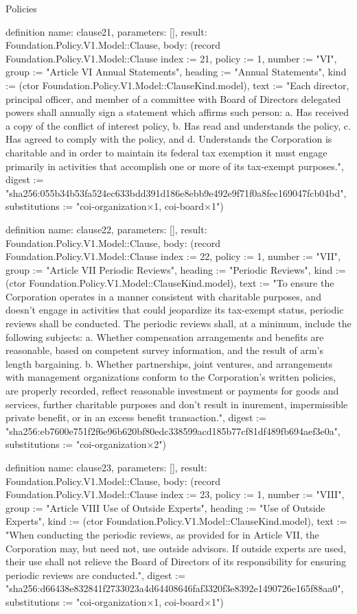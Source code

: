 \begin{lexlean}{Policies}
\begin{semanticmodule}
definition{
  name: clause21,
  parameters: [],
  result: Foundation.Policy.V1.Model::Clause,
  body: (record Foundation.Policy.V1.Model::Clause {index := 21, policy := 1, number := "VI", group := "Article VI Annual Statements", heading := "Annual Statements", kind := (ctor Foundation.Policy.V1.Model::ClauseKind.model), text := "Each director, principal officer, and member of a committee with Board of Directors delegated powers shall annually sign a statement which affirms such person: a. Has received a copy of the conflict of interest policy, b. Has read and understands the policy, c. Has agreed to comply with the policy, and d. Understands the Corporation is charitable and in order to maintain its federal tax exemption it must engage primarily in activities that accomplish one or more of its tax-exempt purposes.", digest := "sha256:055b34b53fa524ec633bdd391d186e8ebb9e492e9f71f0a8fec169047fcb04bd", substitutions := "coi-organization×1, coi-board×1"})
}

definition{
  name: clause22,
  parameters: [],
  result: Foundation.Policy.V1.Model::Clause,
  body: (record Foundation.Policy.V1.Model::Clause {index := 22, policy := 1, number := "VII", group := "Article VII Periodic Reviews", heading := "Periodic Reviews", kind := (ctor Foundation.Policy.V1.Model::ClauseKind.model), text := "To ensure the Corporation operates in a manner consistent with charitable purposes, and doesn't engage in activities that could jeopardize its tax-exempt status, periodic reviews shall be conducted. The periodic reviews shall, at a minimum, include the following subjects: a. Whether compensation arrangements and benefits are reasonable, based on competent survey information, and the result of arm's length bargaining. b. Whether partnerships, joint ventures, and arrangements with management organizations conform to the Corporation's written policies, are properly recorded, reflect reasonable investment or payments for goods and services, further charitable purposes and don't result in inurement, impermissible private benefit, or in an excess benefit transaction.", digest := "sha256:eb7600e751f2f6e96b620bf80edc338599acd185b77cf81df489fb694aef3e0a", substitutions := "coi-organization×2"})
}

definition{
  name: clause23,
  parameters: [],
  result: Foundation.Policy.V1.Model::Clause,
  body: (record Foundation.Policy.V1.Model::Clause {index := 23, policy := 1, number := "VIII", group := "Article VIII Use of Outside Experts", heading := "Use of Outside Experts", kind := (ctor Foundation.Policy.V1.Model::ClauseKind.model), text := "When conducting the periodic reviews, as provided for in Article VII, the Corporation may, but need not, use outside advisors. If outside experts are used, their use shall not relieve the Board of Directors of its responsibility for ensuring periodic reviews are conducted.", digest := "sha256:d66438e832841f2733023a4d64408646faf3320f3e8392e1490726e165f88aa0", substitutions := "coi-organization×1, coi-board×1"})
}


\end{semanticmodule}
\end{lexlean}
